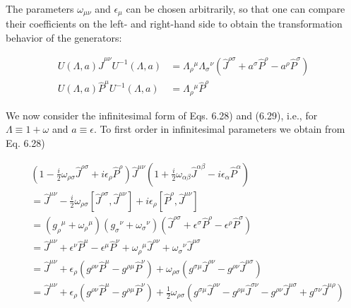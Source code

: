 \documentclass[10pt, letterpaper]{article}
\begin{document}
The parameters $\omega_{\mu \nu}$ and $\epsilon_{\mu}$ can be chosen arbitrarily, so that one can compare their coefficients on the left- and right-hand side to obtain the transformation behavior of the generators:

$$
\begin{aligned}
U(\Lambda, a) \hat{J}^{\mu \nu} U^{-1}(\Lambda, a) & =\Lambda_{\rho}{ }^{\mu} \Lambda_{\sigma}{ }^{\nu}\left(\hat{J}^{\rho \sigma}+a^{\sigma} \hat{P}^{\rho}-a^{\rho} \hat{P}^{\sigma}\right) \\
U(\Lambda, a) \hat{P}^{\mu} U^{-1}(\Lambda, a) & =\Lambda_{\rho}{ }^{\mu} \hat{P}^{\rho}
\end{aligned}
$$

We now consider the infinitesimal form of Eqs. 6.28) and (6.29), i.e., for $\Lambda \equiv 1+\omega$ and $a \equiv \epsilon$. To first order in infinitesimal parameters we obtain from Eq. 6.28)

$$
\begin{aligned}
& \left(1-\frac{i}{2} \omega_{\rho \sigma} \hat{J}^{\rho \sigma}+i \epsilon_{\rho} \hat{P}^{\rho}\right) \hat{J}^{\mu \nu}\left(1+\frac{i}{2} \omega_{\alpha \beta} \hat{J}^{\alpha \beta}-i \epsilon_{\alpha} \hat{P}^{\alpha}\right) \\
& =\hat{J}^{\mu \nu}-\frac{i}{2} \omega_{\rho \sigma}\left[\hat{J}^{\rho \sigma}, \hat{J}^{\mu \nu}\right]+i \epsilon_{\rho}\left[\hat{P}^{\rho}, \hat{J}^{\mu \nu}\right] \\
& =\left(g_{\rho}{ }^{\mu}+\omega_{\rho}{ }^{\mu}\right)\left(g_{\sigma}{ }^{\nu}+\omega_{\sigma}{ }^{\nu}\right)\left(\hat{J}^{\rho \sigma}+\epsilon^{\sigma} \hat{P}^{\rho}-\epsilon^{\rho} \hat{P}^{\sigma}\right) \\
& =\hat{J}^{\mu \nu}+\epsilon^{\nu} \hat{P}^{\mu}-\epsilon^{\mu} \hat{P}^{\nu}+\omega_{\rho}{ }^{\mu} \hat{J}^{\rho \nu}+\omega_{\sigma}{ }^{\nu} \hat{J}^{\mu \sigma} \\
& =\hat{J}^{\mu \nu}+\epsilon_{\rho}\left(g^{\rho \nu} \hat{P}^{\mu}-g^{\rho \mu} \hat{P}^{\nu}\right)+\omega_{\rho \sigma}\left(g^{\sigma \mu} \hat{J}^{\rho \nu}-g^{\rho \nu} \hat{J}^{\mu \sigma}\right) \\
& =\hat{J}^{\mu \nu}+\epsilon_{\rho}\left(g^{\rho \nu} \hat{P}^{\mu}-g^{\rho \mu} \hat{P}^{\nu}\right)+\frac{1}{2} \omega_{\rho \sigma}\left(g^{\sigma \mu} \hat{J}^{\rho \nu}-g^{\rho \mu} \hat{J}^{\sigma \nu}-g^{\rho \nu} \hat{J}^{\mu \sigma}+g^{\sigma \nu} \hat{J}^{\mu \rho}\right)
\end{aligned}
$$
\end{document}
